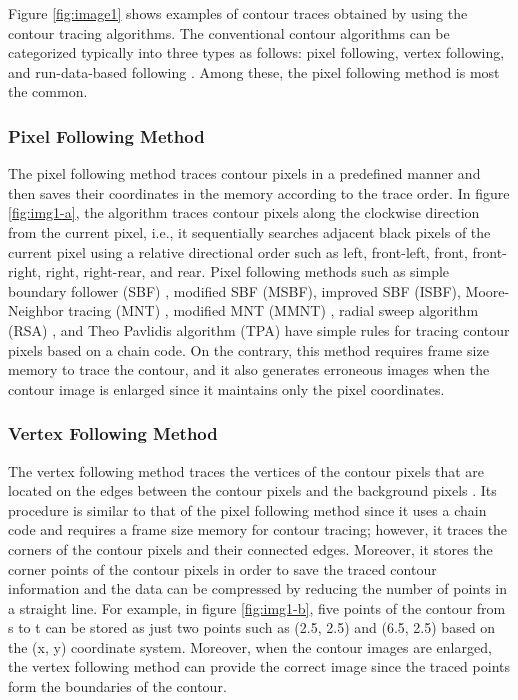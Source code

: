 Figure \ref{fig:image1} shows examples of contour traces obtained by using the contour tracing algorithms. The conventional contour algorithms can be categorized typically into three types as follows: pixel following, vertex following, and run-data-based following \cite{Miyatake1997Contour,Danielsson1981Improvement,Shoji1999Contour}. Among these, the pixel following method is most the common.

\subsubsection{Pixel Following Method}

The pixel following method traces contour pixels in a predefined manner and then saves their coordinates in the memory according to the trace order. In figure \ref{fig:img1-a}, the algorithm traces contour pixels along the clockwise direction from the current pixel, i.e., it sequentially searches adjacent black pixels of the current pixel using a relative directional order such as left, front-left, front, front-right, right, right-rear, and rear. Pixel following methods such as simple boundary follower (SBF) \cite{Pitas2000Digital,Das1990Bivariate,Papert1973Uses}, modified SBF (MSBF)\cite{Gose1996Pattern}, improved SBF (ISBF)\cite{Cheong2006Improved}, Moore-Neighbor tracing (MNT) \cite{Toussaint????Grids}, modified MNT (MMNT) \cite{Pradhan2010Contour}, radial sweep algorithm (RSA) \cite{Mirante1982Radial}, and Theo Pavlidis algorithm (TPA)\cite{Pavlidis2012Algorithms} have simple rules for tracing contour pixels based on a chain code. On the contrary, this method requires frame size memory to trace the contour, and it also generates erroneous images when the contour image is enlarged\cite{Miyatake1997Contour} since it maintains only the pixel coordinates.

\subsubsection{Vertex Following Method}
The vertex following method traces the vertices of the contour pixels that are located on the edges between the contour pixels and the background pixels \cite{Miyatake1997Contour}. Its procedure is similar to that of the pixel following method since it uses a chain code and requires a frame size memory for contour tracing; however, it traces the corners of the contour pixels and their connected edges. Moreover, it stores the corner points of the contour pixels in order to save the traced contour information and the data can be compressed by reducing the number of points in a straight line. For example, in figure \ref{fig:img1-b}, five points of the contour from s to t can be stored as just two points such as (2.5, 2.5) and (6.5, 2.5) based on the (x, y) coordinate system. Moreover, when the contour images are enlarged, the vertex following method can provide the correct image \cite{Miyatake1997Contour} since the traced points form the boundaries of the contour.

